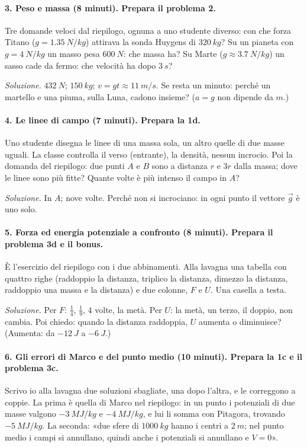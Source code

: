 \documentclass[11pt]{report}
\begin{document}
\paragraph{3. Peso e massa (8 minuti). Prepara il problema 2.}
Tre domande veloci dal riepilogo, ognuna a uno studente diverso: con che
forza Titano ($g = \SI{1.35}{N/kg}$) attirava la sonda Huygens di
$\SI{320}{kg}$? Su un pianeta con $g = \SI{4}{N/kg}$ un masso pesa
$\SI{600}{N}$: che massa ha? Su Marte ($g \approx \SI{3.7}{N/kg}$) un
sasso cade da fermo: che velocità ha dopo $\SI{3}{s}$?

\emph{Soluzione.} $\SI{432}{N}$; $\SI{150}{kg}$; $v = gt \approx
\SI{11}{m/s}$. Se resta un minuto: perché un martello e una piuma, sulla
Luna, cadono insieme? ($a = g$ non dipende da $m$.)

\paragraph{4. Le linee di campo (7 minuti). Prepara la 1d.}
Uno studente disegna le linee di una massa sola, un altro quelle di due
masse uguali. La classe controlla il verso (entrante), la densità, nessun
incrocio. Poi la domanda del riepilogo: due punti $A$ e $B$ sono a
distanza $r$ e $3r$ dalla massa; dove le linee sono più fitte? Quante
volte è più intenso il campo in $A$?

\emph{Soluzione.} In $A$; nove volte. Perché non si incrociano: in ogni
punto il vettore $\vec g$ è uno solo.

\paragraph{5. Forza ed energia potenziale a confronto (8 minuti). Prepara il problema 3d e il bonus.}
È l'esercizio del riepilogo con i due abbinamenti. Alla lavagna una
tabella con quattro righe (raddoppio la distanza, triplico la distanza,
dimezzo la distanza, raddoppio una massa e la distanza) e due colonne,
$F$ e $U$. Una casella a testa.

\emph{Soluzione.} Per $F$: $\tfrac14$, $\tfrac19$, $4$ volte, la metà.
Per $U$: la metà, un terzo, il doppio, non cambia. Poi chiedo: quando la
distanza raddoppia, $U$ aumenta o diminuisce? (Aumenta: da
$\SI{-12}{J}$ a $\SI{-6}{J}$.)

\paragraph{6. Gli errori di Marco e del punto medio (10 minuti). Prepara la 1c e il problema 3c.}
Scrivo io alla lavagna due soluzioni sbagliate, una dopo l'altra, e le
correggono a coppie. La prima è quella di Marco nel riepilogo: in un punto
i potenziali di due masse valgono $\SI{-3}{MJ/kg}$ e $\SI{-4}{MJ/kg}$, e
lui li somma con Pitagora, trovando $\SI{-5}{MJ/kg}$. La seconda: «due
sfere di $\SI{1000}{kg}$ hanno i centri a $\SI{2}{m}$; nel punto medio i
campi si annullano, quindi anche i potenziali si annullano e $V = 0$».
\end{document}
